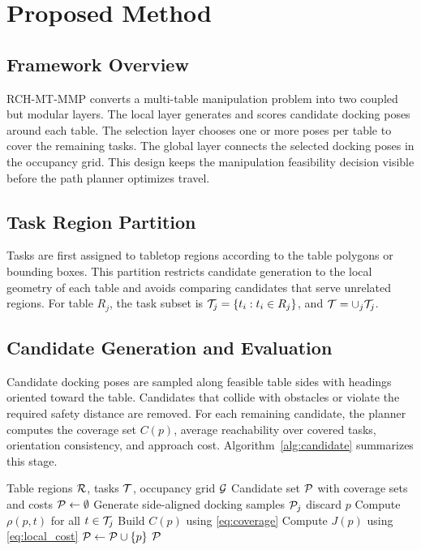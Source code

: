 \section{Proposed Method}
\label{sec:method}

\subsection{Framework Overview}
RCH-MT-MMP converts a multi-table manipulation problem into two coupled but modular layers. The local layer generates and scores candidate docking poses around each table. The selection layer chooses one or more poses per table to cover the remaining tasks. The global layer connects the selected docking poses in the occupancy grid. This design keeps the manipulation feasibility decision visible before the path planner optimizes travel.

\subsection{Task Region Partition}
Tasks are first assigned to tabletop regions according to the table polygons or bounding boxes. This partition restricts candidate generation to the local geometry of each table and avoids comparing candidates that serve unrelated regions. For table \(R_j\), the task subset is \(\mathcal{T}_j=\{t_i:t_i\in R_j\}\), and \(\mathcal{T}=\cup_j \mathcal{T}_j\).

\subsection{Candidate Generation and Evaluation}
Candidate docking poses are sampled along feasible table sides with headings oriented toward the table. Candidates that collide with obstacles or violate the required safety distance are removed. For each remaining candidate, the planner computes the coverage set \(C(p)\), average reachability over covered tasks, orientation consistency, and approach cost. Algorithm~\ref{alg:candidate} summarizes this stage.

\begin{algorithm}[t]
\caption{Candidate docking-pose generation and evaluation}
\label{alg:candidate}
\begin{algorithmic}[1]
\REQUIRE Table regions \(\mathcal{R}\), tasks \(\mathcal{T}\), occupancy grid \(\mathcal{G}\)
\ENSURE Candidate set \(\mathcal{P}\) with coverage sets and costs
\STATE \(\mathcal{P} \leftarrow \emptyset\)
    \STATE Generate side-aligned docking samples \(\mathcal{P}_j\)
            \STATE discard \(p\)
        \ELSE
            \STATE Compute \(\rho(p,t)\) for all \(t\in\mathcal{T}_j\)
            \STATE Build \(C(p)\) using \eqref{eq:coverage}
            \STATE Compute \(J(p)\) using \eqref{eq:local_cost}
            \STATE \(\mathcal{P} \leftarrow \mathcal{P} \cup \{p\}\)
        \ENDIF
    \ENDFOR
\ENDFOR
\RETURN \(\mathcal{P}\)
\end{algorithmic}
\end{algorithm}

